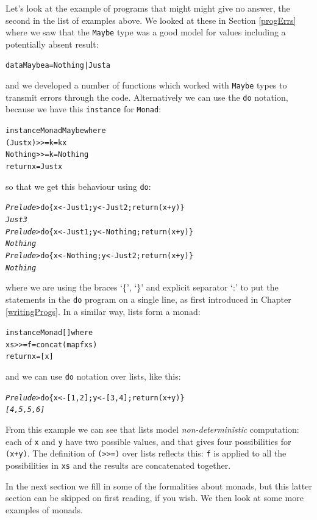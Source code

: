 Let's look at the example of programs that might might give no answer, the second in the list of examples above. We looked at these in Section \ref{progErrs} where we saw that the \texttt{Maybe} type was a good model for values including a potentially absent result:
\begin{alltt}
data Maybe a = Nothing | Just a
\end{alltt}
and we developed a number of functions which worked with \texttt{Maybe} types to transmit errors through the code. Alternatively we can use the \texttt{do} notation, because we have this \texttt{instance} for \texttt{Monad}:
\begin{alltt}
instance Monad Maybe where
  (Just x) >>= k  =  k x
  Nothing  >>= k  =  Nothing
  return x        =  Just x
\end{alltt}
so that we get this behaviour using \texttt{do}:
\begin{alltt}
\textsl{Prelude>} do \{ x <- Just 1; y <- Just 2; return (x+y) \}
\textsl{Just 3}
\textsl{Prelude>} do \{ x <- Just 1; y <- Nothing; return (x+y) \}
\textsl{Nothing}
\textsl{Prelude>} do \{ x <- Nothing; y <- Just 2; return (x+y) \}
\textsl{Nothing}
\end{alltt}
where we are using the braces `\{', `\}' and explicit separator `:' to put the statements in the \texttt{do} program on a single line, as first introduced in Chapter \ref{writingProgs}. In a similar way, lists form a monad:
\begin{alltt}
instance Monad [] where
  xs >>= f  = concat (map f xs)
  return x  = [x]
\end{alltt} 
and we can use \texttt{do} notation over lists, like this:
\begin{alltt}
\textsl{Prelude>} do \{ x <- [1,2]; y <- [3,4]; return (x+y) \}
\textsl{[4,5,5,6]}
\end{alltt}
From this example we can see that lists model \emph{non-deterministic} computation: each of \texttt{x} and \texttt{y} have two possible values, and that gives four possibilities for \texttt{(x+y)}. The definition of \texttt{(>>=)} over lists reflects this: \texttt{f} is applied to all the possibilities in \texttt{xs} and the results are concatenated together.

In the next section we fill in some of the formalities about monads, but this latter section can be skipped on first reading, if you wish. We then look at some more examples of monads.



